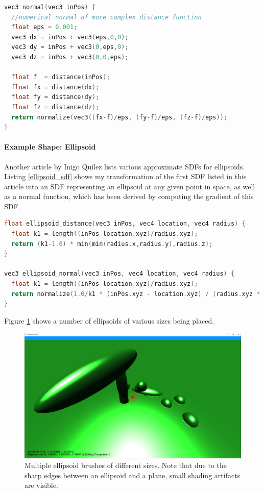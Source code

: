\documentclass{article}
\begin{document}
\begin{lstlisting}[language=C++,label={numerical_gradient},caption={Approximation of the normal of an SDF. Note however, that this requires 4 evaluations of the SDF. The constant \texttt{eps} can be adjusted for precision as required.}]
vec3 normal(vec3 inPos) {
  //numerical normal of more complex distance function
  float eps = 0.001;
  vec3 dx = inPos + vec3(eps,0,0);
  vec3 dy = inPos + vec3(0,eps,0);
  vec3 dz = inPos + vec3(0,0,eps);

  float f  = distance(inPos);
  float fx = distance(dx);
  float fy = distance(dy);
  float fz = distance(dz);
  return normalize(vec3((fx-f)/eps, (fy-f)/eps, (fz-f)/eps));
}
\end{lstlisting}

\paragraph{Example Shape: Ellipsoid}
Another article by Inigo Quilez\cite{quilez:ellipsoid} lists various approximate SDFs for ellipsoids. Listing \ref{ellipsoid_sdf} shows my transformation of the first SDF listed in this article into an SDF representing an ellipsoid at any given point in space, as well as a normal function, which has been derived by computing the gradient of this SDF.

\begin{lstlisting}[language=C++,label={ellipsoid_sdf},caption={approximate SDF and normal function for an ellipsoid.}]
float ellipsoid_distance(vec3 inPos, vec4 location, vec4 radius) {
  float k1 = length((inPos-location.xyz)/radius.xyz);
  return (k1-1.0) * min(min(radius.x,radius.y),radius.z);
}

vec3 ellipsoid_normal(vec3 inPos, vec4 location, vec4 radius) {
  float k1 = length((inPos-location.xyz)/radius.xyz);
  return normalize(1.0/k1 * (inPos.xyz - location.xyz) / (radius.xyz * radius.xyz));
}
\end{lstlisting}
Figure \ref{fig:editing_ellipsoids} shows a number of ellipsoids of various sizes being placed.
\begin{figure}[H]
  \includegraphics[width=\textwidth]{editing_ellipsoids}
  \caption{Multiple ellipsoid brushes of different sizes. Note that due to the sharp edges between an ellipsoid and a plane, small shading artifacts are visible.}
  \label{fig:editing_ellipsoids}
\end{figure}
\end{document}
